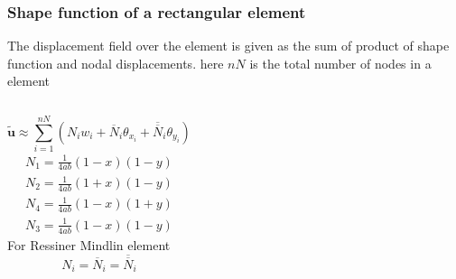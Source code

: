 \documentclass[9pt]{beamer}
\begin{document}
\begin{frame}
\frametitle{Shape function of a rectangular  element}
The displacement field over the element is given as the sum of product of shape function and nodal displacements. here $nN$ is the total number of nodes in a element
 \begin{columns}
\begin{equation*}
\tilde{\mathbf{u}} \approx \sum_{i=1}^{nN}\left(N_iw_i+\overline{N}_i\theta_{x_i}+\overline{\overline{N}}_i\theta_{y_i}\right)
\end{equation*}
\begin{align*}
N_1= \frac{1}{4ab}\left(1-x\right) \left(1-y\right)\\
{N}_2 = \frac{1}{4ab}\left(1+x\right) \left(1-y\right)\\
{N}_4= \frac{1}{4ab}\left(1-x\right) \left(1+y\right)\\
N_3=  \frac{1}{4ab}\left(1-x\right) \left(1-y\right)
\end{align*}
For Ressiner Mindlin  element
\begin{equation*}
N_i =\overline{N}_i =\overline{\overline{N}}_i
\end{equation*}

\begin{figure}[h!]
\centering

\end{figure}
\end{columns}
\end{frame}
\end{document}
